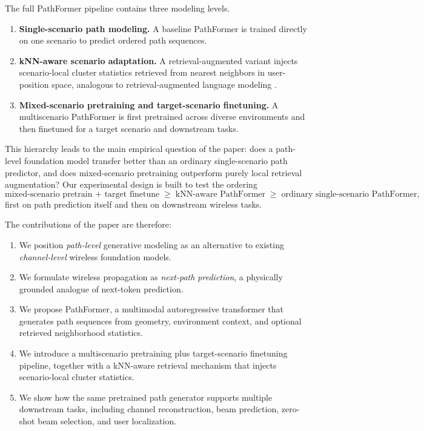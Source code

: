 \documentclass[11pt]{article}
\begin{document}
The full PathFormer pipeline contains three modeling levels.
\begin{enumerate}[leftmargin=1.5em]
    \item \textbf{Single-scenario path modeling.} A baseline PathFormer is trained directly on one scenario to predict ordered path sequences.
    \item \textbf{kNN-aware scenario adaptation.} A retrieval-augmented variant injects scenario-local cluster statistics retrieved from nearest neighbors in user-position space, analogous to retrieval-augmented language modeling \cite{knnlm,retro}.
    \item \textbf{Mixed-scenario pretraining and target-scenario finetuning.} A multiscenario PathFormer is first pretrained across diverse environments and then finetuned for a target scenario and downstream tasks.
\end{enumerate}

This hierarchy leads to the main empirical question of the paper: does a path-level foundation model transfer better than an ordinary single-scenario path predictor, and does mixed-scenario pretraining outperform purely local retrieval augmentation? Our experimental design is built to test the ordering
\[
\text{mixed-scenario pretrain + target finetune}
\;\geq\;
\text{kNN-aware PathFormer}
\;\geq\;
\text{ordinary single-scenario PathFormer},
\]
first on path prediction itself and then on downstream wireless tasks.

The contributions of the paper are therefore:
\begin{enumerate}[leftmargin=1.5em]
    \item We position \emph{path-level} generative modeling as an alternative to existing \emph{channel-level} wireless foundation models.
    \item We formulate wireless propagation as \emph{next-path prediction}, a physically grounded analogue of next-token prediction.
    \item We propose PathFormer, a multimodal autoregressive transformer that generates path sequences from geometry, environment context, and optional retrieved neighborhood statistics.
    \item We introduce a multiscenario pretraining plus target-scenario finetuning pipeline, together with a kNN-aware retrieval mechanism that injects scenario-local cluster statistics.
    \item We show how the same pretrained path generator supports multiple downstream tasks, including channel reconstruction, beam prediction, zero-shot beam selection, and user localization.
\end{enumerate}
\end{document}
